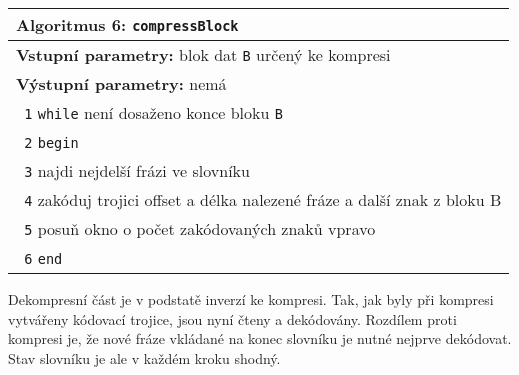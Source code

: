 \begin{table}[!h]
\centering
\begin{tabular}{|l|}
\hline
\textbf{Algoritmus 6:} \texttt{compressBlock}\\
\hline
\textbf{Vstupní parametry:} blok dat \texttt{B} určený ke kompresi\\
\textbf{Výstupní parametry:} nemá\\
\hline
\texttt{ 1} \texttt{while} není dosaženo konce bloku \texttt{B}\\
\texttt{ 2} \texttt{begin}\\
\texttt{ 3} \hspace*{5mm}najdi nejdelší frázi ve slovníku\\
\texttt{ 4} \hspace*{5mm}zakóduj trojici offset a délka nalezené fráze a další znak z bloku B\\
\texttt{ 5} \hspace*{5mm}posuň okno o počet zakódovaných znaků vpravo\\
\texttt{ 6} \texttt{end}\\
\hline
\end{tabular}
\end{table}

Dekompresní část je v podstatě inverzí ke kompresi. Tak, jak byly při kompresi vytvářeny kódovací trojice, jsou nyní čteny a dekódovány. Rozdílem proti kompresi je, že nové fráze vkládané na konec slovníku je nutné nejprve dekódovat. Stav slovníku je ale v každém kroku shodný.